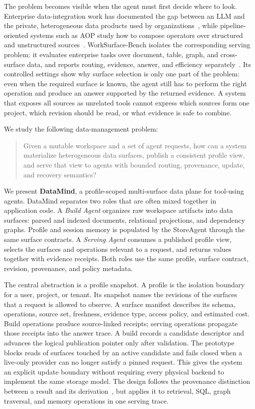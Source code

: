 The problem becomes visible when the agent must first decide where to look.
Enterprise data-integration work has documented the gap between an LLM and the
private, heterogeneous data products used by organizations~\cite{kayali2025mindgap},
while pipeline-oriented systems such as AOP study how to compose operators
over structured and unstructured sources~\cite{wang2025aop}. WorkSurface-Bench
isolates the corresponding serving problem: it evaluates enterprise tasks over
document, table, graph, and cross-surface data, and reports routing, evidence,
answer, and efficiency separately~\cite{worksurfacebench2026}. Its controlled
settings show why surface selection is only one part of the problem: even when
the required surface is known, the agent still has to perform the right
operation and produce an answer supported by the returned evidence. A system
that exposes all sources as unrelated tools cannot express which sources form
one project, which revision should be read, or what evidence is safe to
combine.

We study the following data-management problem:

\begin{quote}
Given a mutable workspace and a set of agent requests, how can a system
materialize heterogeneous data surfaces, publish a consistent profile view,
and serve that view to agents with bounded routing, provenance, update, and
recovery semantics?
\end{quote}

We present \textbf{DataMind}, a profile-scoped multi-surface data plane for
tool-using agents. DataMind separates two roles that are often mixed together
in application code. A \emph{Build Agent} organizes raw workspace artifacts
into data surfaces: parsed and indexed documents, relational projections, and
dependency graphs. Profile and session memory is populated by the StoreAgent
through the same surface contracts. A \emph{Serving Agent} consumes a
published profile view, selects the surfaces and operations relevant to a
request, and returns values together with evidence receipts. Both roles use the
same profile, surface contract, revision, provenance, and policy metadata.

The central abstraction is a profile snapshot. A profile is the isolation
boundary for a user, project, or tenant. Its snapshot names the revisions of
the surfaces that a request is allowed to observe. A surface manifest describes
its schema, operations, source set, freshness, evidence type, access policy,
and estimated cost. Build operations produce source-linked receipts; serving
operations propagate those receipts into the answer trace. A build records a
candidate descriptor and advances the logical publication pointer only after
validation. The prototype blocks reads of surfaces touched by an active
candidate and fails closed when a live-only provider can no longer satisfy a
pinned request. This gives the system an explicit update boundary without
requiring every physical backend to implement the same storage model.
The design follows the provenance distinction between a result and its
derivation~\cite{cheney2009provenance,green2007provenance}, but applies it to
retrieval, SQL, graph traversal, and memory operations in one serving trace.

